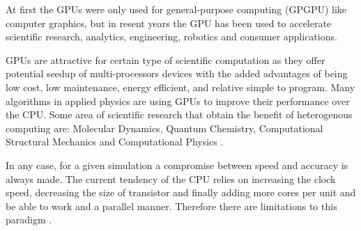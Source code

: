 At first the GPUs were only used for general-purpose computing (GPGPU) like computer graphics, but in resent years the GPU has been used to accelerate scientific research, analytics, engineering, robotics and consumer applications.

GPUs are attractive for certain type of scientific computation as they offer potential seedup of multi-processors devices with the added advantages of being low cost, low maintenance, energy efficient, and relative simple to program. Many algorithms in applied physics are using GPUs to improve their performance over the CPU. Some area of scientific research that obtain the benefit of heterogenous computing are: Molecular Dynamics, Quantum Chemistry, Computational Structural Mechanics and Computational Physics \cite{applications}.

In any case, for a given simulation a compromise between speed and accuracy is always made. The current tendency of the CPU relies on increasing the clock speed, decreasing the size of transistor and finally adding more cores per unit and be able to work and a parallel manner. Therefore there are limitations to this paradigm \cite{quantitative}.

